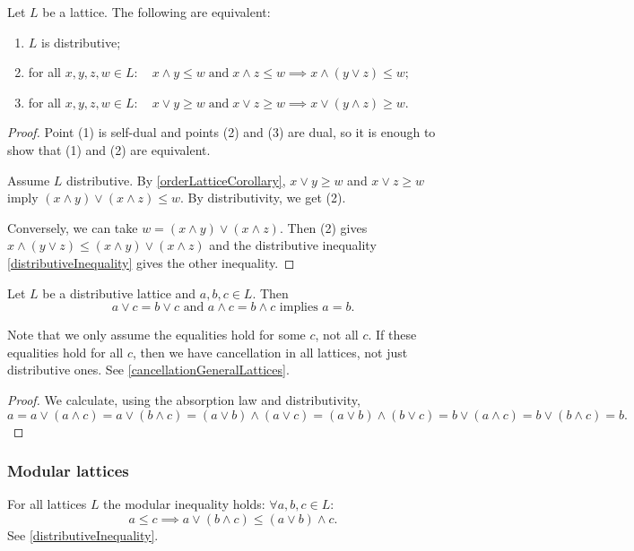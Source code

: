\begin{lemma}
Let $L$ be a lattice. The following are equivalent:
\begin{enumerate}
\item $L$ is distributive;
\item for all $x,y,z,w\in L: \quad x\wedge y \leq w \;\text{and}\; x\wedge z\leq w \implies x\wedge (y\vee z) \leq w;$
\item for all $x,y,z,w\in L: \quad x\vee y \geq w \;\text{and}\; x\vee z\geq w \implies x\vee (y\wedge z) \geq w$.
\end{enumerate}
\end{lemma}
\begin{proof}
Point (1) is self-dual and points (2) and (3) are dual, so it is enough to show that (1) and (2) are equivalent.

Assume $L$ distributive. By \ref{orderLatticeCorollary}, $ x\vee y \geq w$ and $x\vee z\geq w$ imply $(x\wedge y)\vee (x\wedge z) \leq w$. By distributivity, we get (2).

Conversely, we can take $w = (x\wedge y)\vee (x\wedge z)$. Then (2) gives $x\wedge (y\vee z) \leq (x\wedge y)\vee (x\wedge z)$ and the distributive inequality \ref{distributiveInequality} gives the other inequality. 
\end{proof}

\begin{proposition} \label{cancellationDistributiveLattices}
Let $L$ be a distributive lattice and $a,b,c\in L$. Then
\[ \text{$a\vee c = b \vee c$ and $a\wedge c = b \wedge c$ implies $a = b$.} \]
\end{proposition}
Note that we only assume the equalities hold for some $c$, not all $c$. If these equalities hold for all $c$, then we have cancellation in all lattices, not just distributive ones. See \ref{cancellationGeneralLattices}.
\begin{proof}
We calculate, using the absorption law and distributivity,
\[ a = a\vee (a\wedge c) = a \vee (b\wedge c) = (a\vee b)\wedge (a\vee c) = (a\vee b) \wedge (b\vee c) = b \vee (a \wedge c) = b \vee (b\wedge c) = b. \]
\end{proof}

\subsubsection{Modular lattices}
For all lattices $L$ the modular inequality holds: $\forall a,b,c \in L$:
\[ a\leq c \implies a \vee (b\wedge c) \leq (a\vee b) \wedge c. \]
See \ref{distributiveInequality}.

